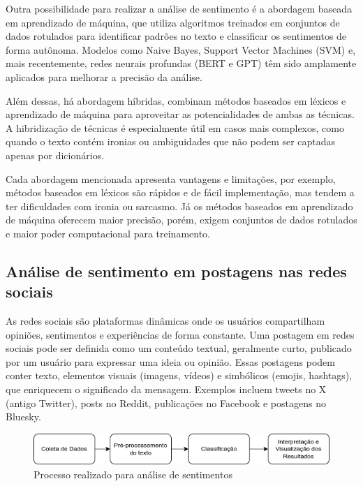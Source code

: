 \documentclass[
	12pt,				%
	oneside,			%
	a4paper,			%
	english,			%
	french,				%
	spanish,			%
	brazil				%
	]{abntex2}
\begin{document}
Outra possibilidade para realizar a análise de sentimento é a abordagem
baseada em aprendizado de máquina, que utiliza algoritmos treinados em
conjuntos de dados rotulados para identificar padrões no texto e
classificar os sentimentos de forma autônoma. Modelos como Naive Bayes,
Support Vector Machines (SVM) e, mais recentemente, redes neurais
profundas (BERT e GPT) têm sido amplamente aplicados para melhorar a
precisão da análise.

Além dessas, há abordagem híbridas, combinam métodos baseados em léxicos
e aprendizado de máquina para aproveitar as potencialidades de ambas as
técnicas. A hibridização de técnicas é especialmente útil em casos mais
complexos, como quando o texto contém ironias ou ambiguidades que não
podem ser captadas apenas por dicionários.

Cada abordagem mencionada apresenta vantagens e limitações, por exemplo,
métodos baseados em léxicos são rápidos e de fácil implementação, mas
tendem a ter dificuldades com ironia ou sarcasmo. Já os métodos baseados
em aprendizado de máquina oferecem maior precisão, porém, exigem
conjuntos de dados rotulados e maior poder computacional para
treinamento.

\hypertarget{anuxe1lise-de-sentimento-em-postagens-nas-redes-sociais}{%
\subsection{Análise de sentimento em postagens nas redes
sociais}\label{anuxe1lise-de-sentimento-em-postagens-nas-redes-sociais}}

As redes sociais são plataformas dinâmicas onde os usuários compartilham
opiniões, sentimentos e experiências de forma constante. Uma postagem em
redes sociais pode ser definida como um conteúdo textual, geralmente
curto, publicado por um usuário para expressar uma ideia ou opinião.
Essas postagens podem conter texto, elementos visuais (imagens, vídeos)
e simbólicos (emojis, hashtags), que enriquecem o significado da
mensagem. Exemplos incluem tweets no X (antigo Twitter), posts no
Reddit, publicações no Facebook e postagens no Bluesky.

\begin{figure}[htbp]
\hypertarget{processo_analise_sentimentos}{%
\caption{Processo realizado para análise de sentimentos}\label{processo_analise_sentimentos}
\begin{center}
\includegraphics[scale=0.7]{imagens/processo_analise_sentimentos.png}
\end{center}
}
\end{figure}
\end{document}

